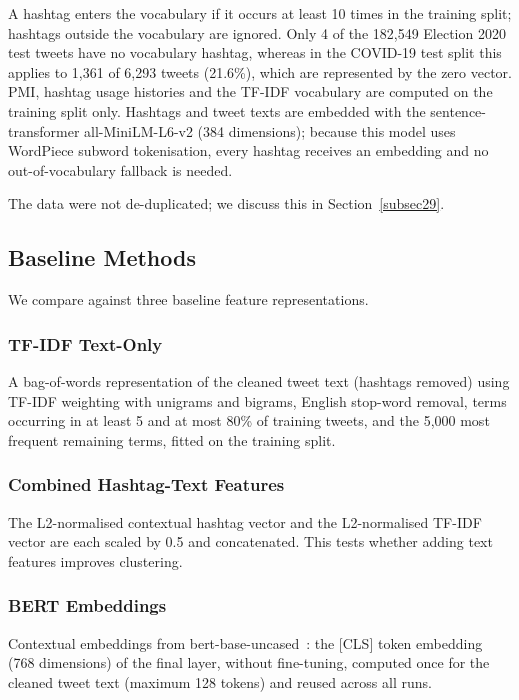 \documentclass[pdflatex,sn-mathphys-num]{sn-jnl}%
\begin{document}
A hashtag enters the vocabulary if it occurs at least 10 times in the training split; hashtags outside the vocabulary are ignored. Only 4 of the 182,549 Election 2020 test tweets have no vocabulary hashtag, whereas in the COVID-19 test split this applies to 1,361 of 6,293 tweets (21.6\%), which are represented by the zero vector. PMI, hashtag usage histories and the TF-IDF vocabulary are computed on the training split only. Hashtags and tweet texts are embedded with the sentence-transformer all-MiniLM-L6-v2 (384 dimensions); because this model uses WordPiece subword tokenisation, every hashtag receives an embedding and no out-of-vocabulary fallback is needed.

The data were not de-duplicated; we discuss this in Section~\ref{subsec29}.

\subsection{Baseline Methods}\label{subsec15}

We compare against three baseline feature representations.

\subsubsection{TF-IDF Text-Only}\label{subsubsec6}

A bag-of-words representation of the cleaned tweet text (hashtags removed) using TF-IDF weighting with unigrams and bigrams, English stop-word removal, terms occurring in at least 5 and at most 80\% of training tweets, and the 5,000 most frequent remaining terms, fitted on the training split.

\subsubsection{Combined Hashtag-Text Features}\label{subsubsec7}

The L2-normalised contextual hashtag vector and the L2-normalised TF-IDF vector are each scaled by 0.5 and concatenated. This tests whether adding text features improves clustering.

\subsubsection{BERT Embeddings}\label{subsubsec8}

Contextual embeddings from bert-base-uncased~\cite{devlin2018}: the [CLS] token embedding (768 dimensions) of the final layer, without fine-tuning, computed once for the cleaned tweet text (maximum 128 tokens) and reused across all runs.
\end{document}
